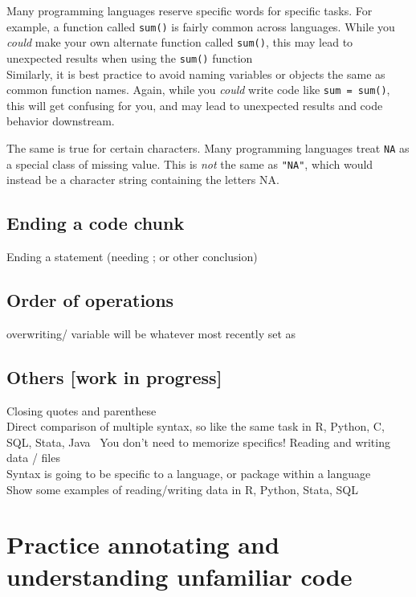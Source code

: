 \documentclass[
]{book}
\begin{document}
Many programming languages reserve specific words for specific tasks.
For example, a function called \texttt{sum()} is fairly common across
languages. While you \emph{could} make your own alternate function called
\texttt{sum()}, this may lead to unexpected results when using the \texttt{sum()}
function\\

Similarly, it is best practice to avoid naming variables or objects the
same as common function names. Again, while you \emph{could} write code like
\texttt{sum\ =\ sum()}, this will get confusing for you, and may lead to
unexpected results and code behavior downstream.

The same is true for certain characters. Many programming languages
treat \texttt{NA} as a special class of missing value. This is \emph{not} the same
as \texttt{"NA"}, which would instead be a character string containing the
letters NA.

\section{Ending a code chunk}\label{ending-a-code-chunk}

Ending a statement (needing ; or other conclusion)

\section{Order of operations}\label{order-of-operations-1}

overwriting/ variable will be whatever most recently set as

\section{Others {[}work in progress{]}}\label{others-work-in-progress}

Closing quotes and parenthese\\
Direct comparison of multiple syntax, so like the same task in R,
Python, C, SQL, Stata, Java~ You don't need to memorize specifics!
Reading and writing data / files\\
Syntax is going to be specific to a language, or package within a
language\\
Show some examples of reading/writing data in R, Python, Stata, SQL

\chapter{Practice annotating and understanding unfamiliar code}\label{practice-annotating-and-understanding-unfamiliar-code}
\end{document}
